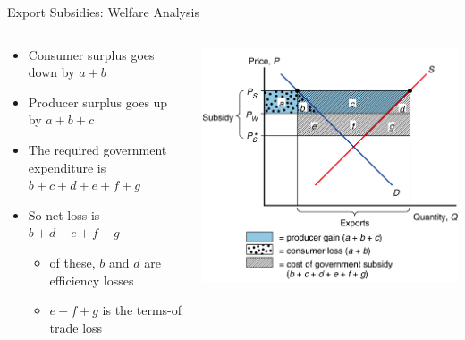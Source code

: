 \documentclass[10pt,hyperref={CJKbookmarks=true},xcolor=dvipsnames,aspectratio=169]{beamer}
\begin{document}
\begin{frame}{Export Subsidies: Welfare Analysis}


\begin{columns}[onlytextwidth]
\begin{column}{0.5\textwidth}
\begin{itemize}
\item Consumer surplus goes down by $a+b$ 
\item Producer surplus goes up by $a+b+c$
\item The required government expenditure is $b+c+d+e+f+g$
\item So net loss is $b+d+e+f+g$

\begin{itemize}
\item of these, $b$ and $d$ are efficiency losses 
\item $e+f+g$ is the terms-of trade loss
\end{itemize}
\end{itemize}

\end{column}
\begin{column}{0.5\textwidth}
\includegraphics[width=0.9\columnwidth]{fig/instruments/lec07-11}
\end{column}
\end{columns}

\end{frame}
\end{document}

